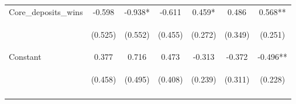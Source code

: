 \documentclass[]{article}
\begin{document}
\begin{center}
\begin{tabular}{lcccccc}
Core\_deposits\_wins & -0.598 & -0.938* & -0.611 & 0.459* & 0.486 & 0.568** \\
\vspace{4pt} & \begin{footnotesize}(0.525)\end{footnotesize} & \begin{footnotesize}(0.552)\end{footnotesize} & \begin{footnotesize}(0.455)\end{footnotesize} & \begin{footnotesize}(0.272)\end{footnotesize} & \begin{footnotesize}(0.349)\end{footnotesize} & \begin{footnotesize}(0.251)\end{footnotesize} \\
Constant & 0.377 & 0.716 & 0.473 & -0.313 & -0.372 & -0.496** \\
 & \begin{footnotesize}(0.458)\end{footnotesize} & \begin{footnotesize}(0.495)\end{footnotesize} & \begin{footnotesize}(0.408)\end{footnotesize} & \begin{footnotesize}(0.239)\end{footnotesize} & \begin{footnotesize}(0.311)\end{footnotesize} & \begin{footnotesize}(0.228)\end{footnotesize} \\
\vspace{4pt} & \begin{footnotesize}\end{footnotesize} & \begin{footnotesize}\end{footnotesize} & \begin{footnotesize}\end{footnotesize} & \begin{footnotesize}\end{footnotesize} & \begin{footnotesize}\end{footnotesize} & \begin{footnotesize}\end{footnotesize} \\

\end{tabular}
\end{center}
\end{document}
